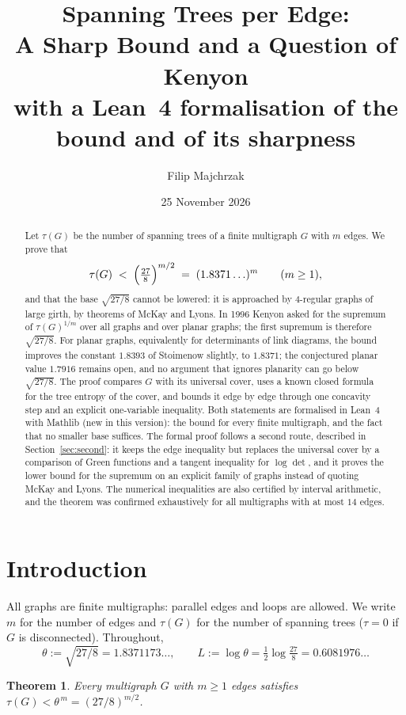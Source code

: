 \documentclass[11pt]{amsart}
\title[Spanning trees per edge]{Spanning Trees per Edge:\\ A Sharp Bound and a Question of Kenyon\\[4pt] {\normalfont\large with a Lean~4 formalisation of the bound and of its sharpness}}
\author{Filip Majchrzak}
\date{25 November 2026}
\theoremstyle{plain}
\newtheorem{theorem}{Theorem}
\theoremstyle{remark}
\newcommand{\tht}{\theta}
\begin{document}
\begin{abstract}
Let $\tau(G)$ be the number of spanning trees of a finite multigraph $G$ with $m$ edges. We prove that
\[
  \tau(G)\;<\;\Bigl(\tfrac{27}{8}\Bigr)^{m/2}\;=\;(1.8371\ldots)^m\qquad(m\ge1),
\]
and that the base $\sqrt{27/8}$ cannot be lowered: it is approached by $4$-regular graphs of large girth, by
theorems of McKay and Lyons. In 1996 Kenyon asked for the supremum of $\tau(G)^{1/m}$ over all graphs and over planar graphs;
the first supremum is therefore $\sqrt{27/8}$. For planar graphs, equivalently for determinants of link diagrams,
the bound improves the constant $1.8393$ of Stoimenow slightly, to $1.8371$; the conjectured planar value
$1.7916$ remains open, and no argument that ignores planarity can go below $\sqrt{27/8}$. The proof compares
$G$ with its universal cover, uses a known closed formula for the tree entropy of the cover, and bounds it edge
by edge through one concavity step and an explicit one-variable inequality.
Both statements are formalised in Lean~4 with Mathlib (new in this version): the bound for every finite multigraph, and the fact that no smaller base suffices. The formal proof follows a second route, described in Section~\ref{sec:second}: it keeps the edge inequality but replaces the universal cover by a comparison of Green functions and a tangent inequality for $\log\det$, and it proves the lower bound for the supremum on an explicit family of graphs instead of quoting McKay and Lyons. The numerical inequalities are also certified by interval arithmetic, and the theorem was confirmed exhaustively for all multigraphs with at most $14$ edges.
\end{abstract}

\maketitle

\section{Introduction}

All graphs are finite multigraphs: parallel edges and loops are allowed. We write $m$ for the number of edges and
$\tau(G)$ for the number of spanning trees ($\tau=0$ if $G$ is disconnected). Throughout,
\[
  \tht:=\sqrt{27/8}=1.8371173\ldots,\qquad L:=\log\tht=\tfrac12\log\tfrac{27}{8}=0.6081976\ldots
\]

\begin{theorem}\label{thm:main}
Every multigraph $G$ with $m\ge1$ edges satisfies $\tau(G)<\tht^{\,m}=(27/8)^{m/2}$.
\end{theorem}
\end{document}
